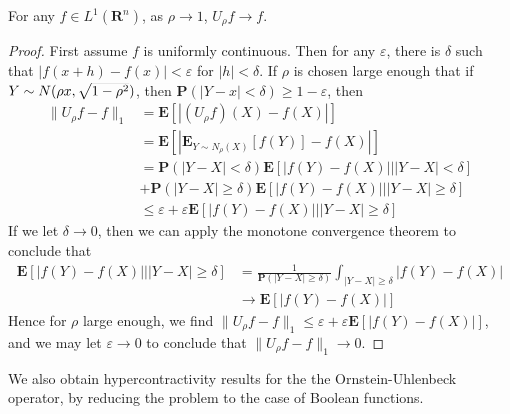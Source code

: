 \begin{theorem}
    For any $f \in L^1(\mathbf{R}^n)$, as $\rho \to 1$, $U_\rho f \to f$.
\end{theorem}
\begin{proof}
    First assume $f$ is uniformly continuous. Then for any $\varepsilon$, there is $\delta$ such that $|f(x + h) - f(x)| < \varepsilon$ for $|h| < \delta$. If $\rho$ is chosen large enough that if $Y \sim \smash{N( \rho x ,\sqrt{1 - \rho^2})}$, then $\mathbf{P}(|Y - x| < \delta) \geq 1 - \varepsilon$, then
    \begin{align*}
        \| U_\rho f - f \|_1 &= \mathbf{E} \left[ |(U_\rho f)(X) - f(X)|  \right]\\
        &= \mathbf{E} \left[ |\mathbf{E}_{Y \sim N_\rho(X)}[f(Y)] - f(X)| \right]\\
        &= \mathbf{P}(|Y - X| < \delta) \mathbf{E}[|f(Y) - f(X)| | |Y - X| < \delta]\\
        &+ \mathbf{P}(|Y - X| \geq \delta) \mathbf{E}[|f(Y) - f(X)| | |Y - X| \geq \delta]\\
        &\leq \varepsilon + \varepsilon \mathbf{E}[|f(Y) - f(X)|  |  |Y - X| \geq \delta]
    \end{align*}
    If we let $\delta \to 0$, then we can apply the monotone convergence theorem to conclude that
    \begin{align*}
        \mathbf{E} \left[ |f(Y) - f(X)| | |Y - X| \geq \delta \right] &= \frac{1}{\mathbf{P}(|Y-X| \geq \delta)} \int_{|Y - X| \geq \delta} |f(Y) - f(X)|\\
        &\to \mathbf{E}[|f(Y) - f(X)|]
    \end{align*}
    Hence for $\rho$ large enough, we find $\| U_\rho f - f \|_1 \leq \varepsilon + \varepsilon \mathbf{E}[|f(Y) - f(X)|]$, and we may let $\varepsilon \to 0$ to conclude that $\| U_\rho f - f \|_1 \to 0$.
\end{proof}

We also obtain hypercontractivity results for the the Ornstein-Uhlenbeck operator, by reducing the problem to the case of Boolean functions.


